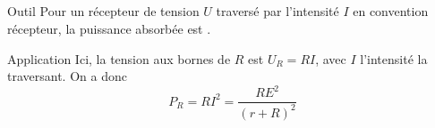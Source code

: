 \documentclass[../main/main.tex]{subfiles}
\begin{document}
\subsection{}
\begin{tcbraster}[raster columns=2, raster equal height=rows]
    \begin{NCdemo}{Outil}
        Pour un récepteur de tension $U$ traversé par l'intensité $I$ en
        convention récepteur, la puissance absorbée est .
    \end{NCdemo}
    \begin{NCexem}{Application}
        Ici, la tension aux bornes de $R$ est $U_R = RI$, avec $I$ l'intensité
        la traversant. On a donc
        \begin{equation*}
            \boxed{P_R = RI^2 = \frac{RE^2}{(r+R)^2}}
        \end{equation*}
    \end{NCexem}
\end{tcbraster}
\end{document}
